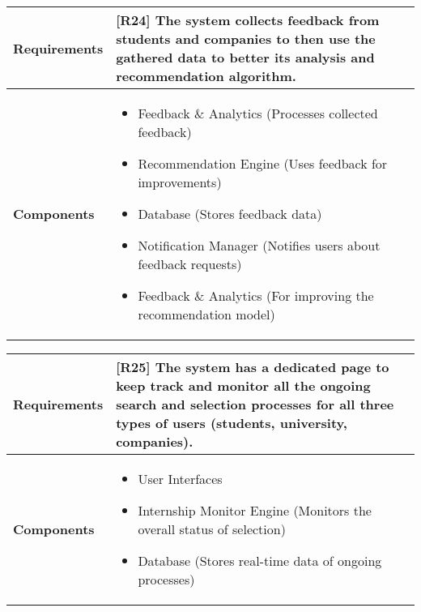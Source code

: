 \begin{table}[h!]
\centering
\begin{tabular}{|l|p{10cm}|}
\hline
\textbf{Requirements} & 
[R24] The system collects feedback from students and companies to then use the gathered data to better its analysis and recommendation algorithm.\\
\hline
\textbf{Components} & 
\begin{itemize}
    \item Feedback \& Analytics (Processes collected feedback)
    \item Recommendation Engine (Uses feedback for improvements)
    \item Database (Stores feedback data)
    \item Notification Manager (Notifies users about feedback requests)
    \item Feedback \& Analytics (For improving the recommendation model)
\end{itemize} \\
\hline
\end{tabular}
\label{tab:req_comp}
\end{table}

\begin{table}[h!]
\centering
\begin{tabular}{|l|p{10cm}|}
\hline
\textbf{Requirements} & 
[R25] The system has a dedicated page to keep track and monitor all the ongoing search and selection processes for all three types of users (students, university, companies).\\
\hline
\textbf{Components} & 
\begin{itemize}
    \item User Interfaces
    \item Internship Monitor Engine (Monitors the overall status of selection)
    \item Database (Stores real-time data of ongoing processes)
\end{itemize} \\
\hline
\end{tabular}
\label{tab:req_comp}
\end{table}

